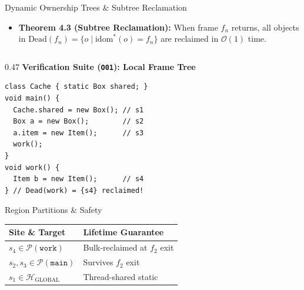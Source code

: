 \documentclass[11pt]{beamer}
\begin{document}
\begingroup
{}
\begin{frame}[fragile]{Dynamic Ownership Trees \& Subtree Reclamation}
  \begin{itemize}
    \small
    \item \textbf{Theorem 4.3 (Subtree Reclamation):} When frame $f_n$ returns, all objects in $\text{Dead}(f_n) = \{ o \mid \text{idom}^*(o) = f_n \}$ are reclaimed in $\mathcal{O}(1)$ time.
  \end{itemize}
  \vspace{-0.6em}

  \begin{columns}[T,onlytextwidth]
    \begin{column}{0.47\textwidth}
      {\scriptsize\bfseries\color{darkblue} Verification Suite (\texttt{O01}): Local Frame Tree}\\[1pt]
\begin{lstlisting}[style=javacodetiny]
class Cache { static Box shared; }
void main() {
  Cache.shared = new Box(); // s1
  Box a = new Box();        // s2
  a.item = new Item();      // s3
  work();
}
void work() {
  Item b = new Item();      // s4
} // Dead(work) = {s4} reclaimed!
\end{lstlisting}
      \vspace{-0.6em}

      \begin{block}{Region Partitions \& Safety}
        \scriptsize
        \begin{tabular}{@{}ll@{}}
          \toprule
          \textbf{Site \& Target} & \textbf{Lifetime Guarantee} \\
          \midrule
          $s_4 \in \mathcal{P}(\texttt{work})$ & Bulk-reclaimed at $f_2$ exit \\
          $s_2, s_3 \in \mathcal{P}(\texttt{main})$ & Survives $f_2$ exit \\
          $s_1 \in \mathcal{H}_{\text{GLOBAL}}$ & Thread-shared static \\
          \bottomrule
        \end{tabular}
      \end{block}
    \end{column}


\end{columns}
\end{frame}
\end{document}
